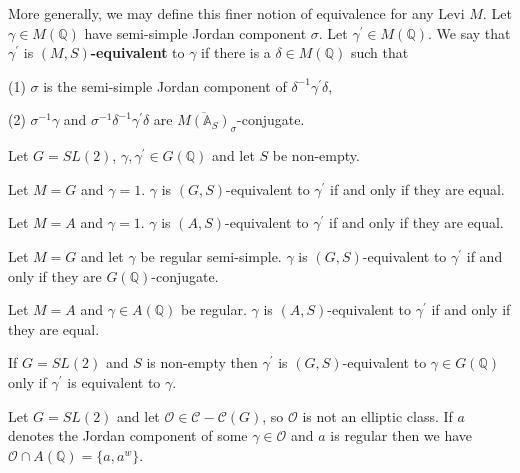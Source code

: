 More generally, we may define this
finer notion of equivalence for any Levi $M$. Let
$\gamma \in M({\mathbb{Q}})$ have semi-simple Jordan
component $\sigma$. Let $\gamma ^{\prime }\in M({\mathbb{Q}})$.
We say that $\gamma ^{\prime }$
is $(M,S)${\bf -equivalent} to $\gamma $ if there is a
$\delta \in M({\mathbb{Q}})$ such that

(1) $\sigma $ is the semi-simple Jordan component of
$\delta ^{-1}\gamma^{\prime }\delta $,

(2) $\sigma ^{-1}\gamma $ and $\sigma ^{-1}\delta ^{-1}
\gamma ^{\prime}\delta $ are
$\overline{M({\mathbb{A}}_{S})}_\sigma$-conjugate.

\begin{example}\label{ex:6.12}
Let $G=SL(2)$, $\gamma,\gamma^{\prime}\in G({\mathbb{Q}})$
and let $S$ be non-empty.

Let $M=G$ and $\gamma =1$. $\gamma$ is $(G,S)$-equivalent to
$\gamma^{\prime}$ if and only if they are equal.

Let $M=A$ and $\gamma =1$. $\gamma$ is $(A,S)$-equivalent to
$\gamma^{\prime}$ if and only if they are equal.

Let $M=G$ and let $\gamma $ be regular semi-simple.
$\gamma$ is $(G,S)$-equivalent to
$\gamma^{\prime}$ if and only if they are $G({\mathbb{Q}})$-conjugate.

Let $M=A$ and $\gamma \in A({\mathbb{Q}})$ be regular.
$\gamma$ is $(A,S)$-equivalent to
$\gamma^{\prime}$ if and only if they are equal.
\end{example}

\begin{lemma}\label{lem:6.13}
If $G=SL(2)$ and $S$ is non-empty then
$\gamma^{\prime}$ is $(G,S)$-equivalent to $\gamma\in G({\mathbb{Q}})$ only if 
$\gamma^{\prime}$ is equivalent to $\gamma$.
\end{lemma}

\begin{example}\label{ex:6.14}
Let $G=SL(2)$ and let ${\mathcal{O}}\in {\mathcal C}-{\mathcal C}(G)$, so
${\mathcal{O}}$ is not an elliptic class. If $a$ denotes the Jordan component of
some $\gamma \in {\mathcal{O}}$ and $a$ is regular then we have
${\mathcal{O}}\cap A({\mathbb{Q}})=\{a,a^w\}$.
\end{example}

